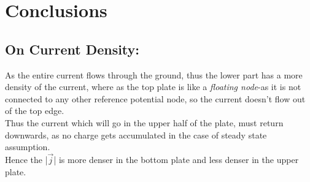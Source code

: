 \documentclass[10pt,english, openany]{book}
\begin{document}
\chapter{Conclusions}
\section{On Current Density:}
As the entire current flows through the ground, thus the lower part has a more density of the current, where as the top plate is like a \textit{floating node}-as it is not connected to any other reference potential node, so the current doesn't flow out of the top edge.\\
Thus the current which will go in the upper half of the plate, must return downwards, as no charge gets accumulated in the case of steady state assumption.\\
Hence the |$\vec{j}$| is more denser in the bottom plate and less denser in the upper plate.

\end{document}
